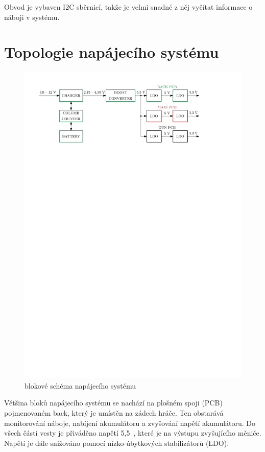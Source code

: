 Obvod je vybaven I2C sběrnicí, takže je velmi snadné z něj vyčítat informace o náboji v systému.

\section{Topologie napájecího systému}
\begin{figure}[H]
    \begin{center}
        \includegraphics[width=\textwidth]{img/power-system}
    \end{center}
    \caption{blokové schéma napájecího systému}
\end{figure}

Většina bloků napájecího systému se nachází na plošném spoji (PCB) pojmenovaném back, který je umístěn na zádech hráče. Ten obstarává monitorování náboje, nabíjení akumulátoru a zvyšování napětí akumulátoru. Do všech částí vesty je přiváděno napětí 5,5~, které je na výstupu zvyšujícího měniče. Napětí je dále snižováno pomocí nízko-úbytkových stabilizátorů (LDO).
